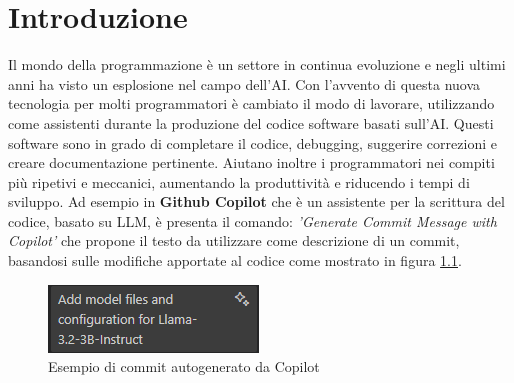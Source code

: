 \documentclass[12pt,a4paper,openright,twoside]{book}
\begin{document}
\chapter{Introduzione}
\label{chap:introduction}
Il mondo della programmazione è un settore in continua evoluzione e negli ultimi anni ha visto un esplosione nel campo dell'\ac{AI}.
Con l'avvento di questa nuova tecnologia per molti programmatori è cambiato il modo di lavorare, utilizzando come assistenti durante la produzione del codice software basati sull'\ac{AI}.
Questi software sono in grado di completare il codice, debugging, suggerire correzioni e creare documentazione pertinente.
Aiutano inoltre i programmatori nei compiti più ripetivi e meccanici, aumentando la produttività e riducendo i tempi di sviluppo.
Ad esempio in \textbf{Github Copilot} che è un assistente per la scrittura del codice, basato su \ac{LLM}, è presenta il comando: \emph{'Generate Commit Message with Copilot'}
che propone il testo da utilizzare come descrizione di un commit, basandosi sulle modifiche apportate al codice come mostrato in figura \cref{fig:Commit-Autogenerato}.
\begin{figure}[h]
    \centering
    \includegraphics[width=0.5\linewidth]{figures/commit.png}
    \caption{Esempio di commit autogenerato da Copilot}
    \label{fig:Commit-Autogenerato}
\end{figure}
\end{document}

